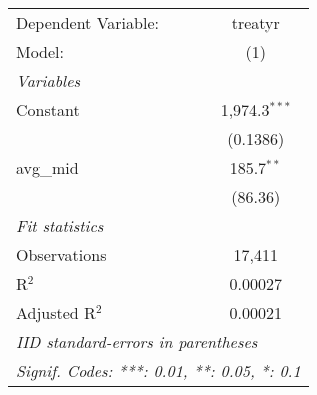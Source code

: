 \begingroup
\centering
\begin{tabular}{lc}
   \tabularnewline \midrule \midrule
   Dependent Variable: & treatyr\\  
   Model:              & (1)\\  
   \midrule
   \emph{Variables}\\
   Constant            & 1,974.3$^{***}$\\   
                       & (0.1386)\\   
   avg\_mid            & 185.7$^{**}$\\   
                       & (86.36)\\   
   \midrule
   \emph{Fit statistics}\\
   Observations        & 17,411\\  
   R$^2$               & 0.00027\\  
   Adjusted R$^2$      & 0.00021\\  
   \midrule \midrule
   \multicolumn{2}{l}{\emph{IID standard-errors in parentheses}}\\
   \multicolumn{2}{l}{\emph{Signif. Codes: ***: 0.01, **: 0.05, *: 0.1}}\\
\end{tabular}
\par\endgroup


